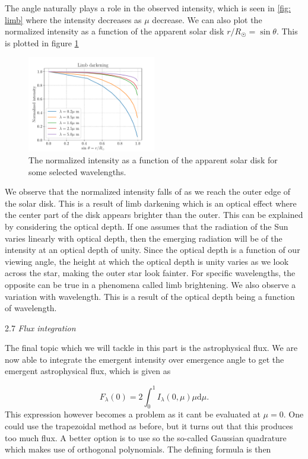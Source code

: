 \documentclass[a4paper,11.5pt,]{article}
\begin{document}
\begin{multicols}{2}
The angle naturally plays a role in the observed intensity, which is seen in \ref{fig: limb} where the intensity decreases as $\mu$ decrease.
We can also plot the normalized intensity as a function of the apparent solar disk $r/R_\Sun = \sin \theta$. This is plotted in figure \ref{fig: norm limb}

\begin{figure}[H]
    \centering
    \includegraphics[width = 0.5\textwidth]{figures/2.6/limbdark_rRsun.pdf}
    \caption{The normalized intensity as a function of the apparent solar disk for some selected wavelengths.}
    \label{fig: norm limb}
\end{figure}
We observe that the normalized intensity falls of as we reach the outer edge of the solar disk. This is a result of limb darkening which is an optical effect where the center part of the disk appears brighter than the outer. This can be explained by considering the optical depth. If one assumes that the radiation of the Sun varies linearly with optical depth, then the emerging radiation will be of the intensity at an optical depth of unity. Since the optical depth is a function of our viewing angle, the height at which the optical depth is unity varies as we look across the star, making the outer star look fainter. For specific wavelengths, the opposite can be true in a phenomena called limb brightening. We also observe a variation with wavelength. This is a result of the optical depth being a function of wavelength.

 \begin{center}
2.7 \textit{Flux integration}
\end{center}

The final topic which we will tackle in this part is the astrophysical flux. We are now able to integrate the emergent intensity over emergence angle to get the emergent astrophysical flux, which is given as

\begin{equation}
    F _ { \lambda } ( 0 ) = 2 \int _ { 0 } ^ { 1 } I _ { \lambda } ( 0 , \mu ) \mu \mathrm { d } \mu.
\end{equation}
This expression however becomes a problem as it cant be evaluated at $\mu = 0$. One could use the trapezoidal method as before, but it turns out that this produces too much flux. A better option is to use so the so-called Gaussian quadrature which makes use of orthogonal polynomials. The defining formula is then


\end{multicols}
\end{document}

